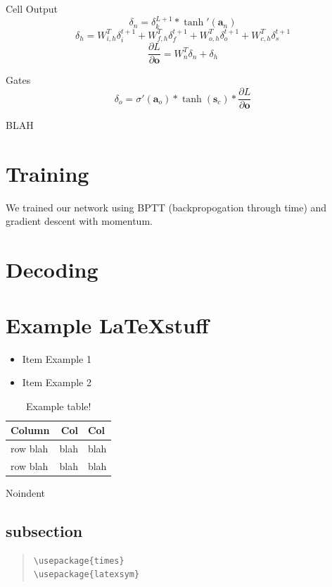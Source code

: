 \documentclass[11pt]{article}
\begin{document}
Cell Output
\[  \delta_{n} = \delta_{k}^{L+1}*\tanh'({\textbf{a}_{n}}) \]
\[ \delta_{h} = W_{i,h}^{T}\delta_{i}^{t+1} +  W_{f,h}^{T}\delta_{f}^{t+1} +  W_{o,h}^{T}\delta_{o}^{t+1} +  W_{c,h}^{T}\delta_{s}^{t+1} \]
\[ \frac{\partial L}{\partial \textbf{o}} = W_{n}^{T} \delta_{n} +  \delta_{h} \]

Gates
\[ \delta_{o} = \sigma'(\textbf{a}_{o}) * \tanh( \textbf{s}_{c}) *  \frac{\partial L}{\partial \textbf{o}} \]

BLAH

\section{Training}

We trained our network using BPTT (backpropogation through time) and
gradient descent with momentum.

\section{Decoding}

\section{Example \LaTeX stuff}
\begin{itemize}
\item Item  Example 1
\item Item Example 2
\end{itemize}

\begin{table}[h]
\begin{center}
\begin{tabular}{|l|rl|}
\hline \bf Column & \bf Col & \bf Col \\ \hline
row blah & blah & blah \\
row blah & blah & blah \\
\hline
\end{tabular}
\end{center}
\caption{\label{font-table} Example table! }
\end{table}

\noindent Noindent


\subsection{subsection}

\begin{quote}
\begin{verbatim}
\usepackage{times}
\usepackage{latexsym}
\end{verbatim}
\end{quote}
\end{document}
